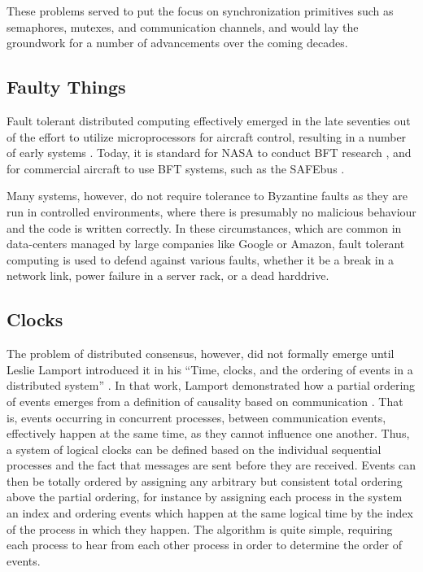 These problems served to put the focus on synchronization primitives
such as semaphores, mutexes, and communication channels,
and would lay the groundwork for a number of advancements over the coming decades.

\subsection{Faulty Things}

Fault tolerant distributed computing effectively emerged in the late seventies 
out of the effort to utilize microprocessors for aircraft control, resulting in a number of early systems \cite{sift,ftmp}.
Today, it is standard for NASA to conduct BFT research \cite{miner2004unified}, 
and for commercial aircraft to use BFT systems, such as the SAFEbus \cite{hoyme1993safebus}.

Many systems, however, do not require tolerance to Byzantine faults as they are run in controlled environments,
where there is presumably no malicious behaviour and the code is written correctly.
In these circumstances, which are common in data-centers managed by large companies like Google or Amazon,
fault tolerant computing is used to defend against various faults,
whether it be a break in a network link, power failure in a server rack, or a dead harddrive.

\subsection{Clocks}

The problem of distributed consensus, however, did not formally emerge until Leslie Lamport introduced it in his 
``Time, clocks, and the ordering of events in a distributed system'' \cite{clocks}.
In that work, Lamport demonstrated how a partial ordering of events emerges from a definition of causality based on communication \cite{clocks}.
That is, events occurring in concurrent processes, between communication events, 
effectively happen at the same time, as they cannot influence one another.
Thus, a system of logical clocks can be defined based on the individual sequential processes 
and the fact that messages are sent before they are received.
Events can then be totally ordered by assigning any arbitrary but consistent total ordering above the partial ordering,
for instance by assigning each process in the system an index and ordering events which happen at the same logical time by the
index of the process in which they happen.
The algorithm is quite simple, requiring each process to hear from each other process in order to determine the order of events.

